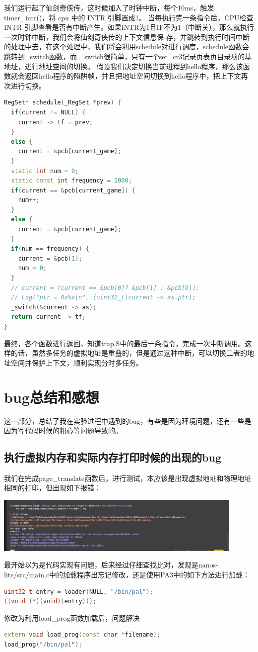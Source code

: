 \documentclass[UTF8,a4paper,10pt]{ctexart}
\begin{document}
我们运行起了仙剑奇侠传，这时候加入了时钟中断，每个10ms，触发timer\_intr()，将 cpu 中的 INTR 引脚置成1。 当每执行完一条指令后，CPU检查 INTR 引脚查看是否有中断产生。如果INTR为1且IF不为1（中断关），那么就执行一次时钟中断，我们会将仙剑奇侠传的上下文信息保 存，并跳转到执行时间中断的处理中去，在这个处理中，我们将会利用schedule对进行调度，schedule函数会跳转到\_switch函数，而 \_switch很简单，只有一个set\_cr3记录页表页目录项的基地址，进行地址空间的切换。
假设我们决定切换当前进程到hello程序，那么该函数就会返回hello程序的陷阱帧，并且把地址空间切换到hello程序中，把上下文再次进行切换。
\begin{lstlisting}[language = C++]
RegSet* schedule(_RegSet *prev) {
  if(current != NULL) {
    current -> tf = prev;
  }
  else {
    current = &pcb[current_game];
  }
  static int num = 0;
  static const int frequency = 1000;
  if(current == &pcb[current_game]) {
    num++;
  }
  else {
    current = &pcb[current_game];
  }
  if(num == frequency) {
    current = &pcb[1];
    num = 0;
  }
  // current = (current == &pcb[0]? &pcb[1] : &pcb[0]);
  // Log("ptr = 0x%x\n", (uint32_t)current -> as.ptr);
  _switch(&current -> as);
  return current -> tf;
}

\end{lstlisting}


最终，各个函数进行返回，知道trap.S中的最后一条指令，完成一次中断调用。这样的话，虽然多任务的虚拟地址是重叠的，但是通过这种中断，可以切换二者的地址空间并保护上下文，顺利实现分时多任务。









\section{bug总结和感想}
这一部分，总结了我在实验过程中遇到的bug，有些是因为环境问题，还有一些是因为写代码时候的粗心等问题导致的。
\subsection{执行虚拟内存和实际内存打印时候的出现的bug}
我们在完成page\_translate函数后，进行测试，本应该是出现虚拟地址和物理地址相同的打印，但出现如下报错：
\begin{center}
\includegraphics[width=0.9\textwidth]{img/报错1}
\end{center}
最开始以为是代码实现有问题，后来经过仔细查找比对，发现是nanos-lite/src/main.c中的加载程序出忘记修改，还是使用PA3中的如下方法进行加载：
\begin{lstlisting}[language = C++]
uint32_t entry = loader(NULL, "/bin/pal");
((void (*)(void))entry)();
\end{lstlisting}
修改为利用load\_prog函数加载后，问题解决
\begin{lstlisting}[language = C++]
extern void load_prog(const char *filename);
load_prog("/bin/pal");
\end{lstlisting}
\end{document}
